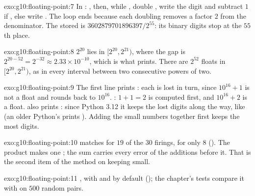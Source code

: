 \begin{solution}{exo:g10:floating-point:7}
In : , then, while , double , write the
digit  and subtract $1$ if , else write . The loop ends because each doubling removes a
factor $2$ from the denominator. The stored  is $3602879701896397/2^{55}$: its binary digits stop at the
$55$th place.
\end{solution}

\begin{solution}{exo:g10:floating-point:8}
$2^{20}$ lies in $[2^{20}, 2^{21})$, where the gap is $2^{20-52} = 2^{-32} \approx 2.33 \times 10^{-10}$, which is
what  prints. There are $2^{52}$ floats in $[2^{20}, 2^{21})$, as in every interval between
two consecutive powers of two.
\end{solution}

\begin{solution}{exo:g10:floating-point:9}
The first line prints : each  is lost in turn, since $10^{16} + 1$ is not a float and rounds back to $10^{16}$.
: $1 + 1 = 2$ is computed first, and $10^{16} + 2$ is a float.  also prints
: since Python 3.12 it keeps the lost digits along the way, like 
(an older Python's  prints ). Adding the small
numbers together first keeps the most digits.
\end{solution}

\begin{solution}{exo:g10:floating-point:10}
 matches  for $19$ of the $30$ firings,  for only $8$
(). The product makes one ; the sum carries every error of the
additions before it. That is the second item of the method on keeping  small.
\end{solution}

\begin{solution}{exo:g10:floating-point:11}
, with  and  by default
(); the chapter's tests compare it with  on $500$ random pairs.
\end{solution}

